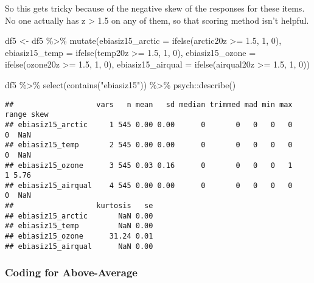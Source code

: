 \documentclass[
]{article}
\newenvironment{Shaded}{\begin{snugshade}}{\end{snugshade}}
\newcommand{\AttributeTok}[1]{\textcolor[rgb]{0.77,0.63,0.00}{#1}}
\newcommand{\DecValTok}[1]{\textcolor[rgb]{0.00,0.00,0.81}{#1}}
\newcommand{\FloatTok}[1]{\textcolor[rgb]{0.00,0.00,0.81}{#1}}
\newcommand{\FunctionTok}[1]{\textcolor[rgb]{0.00,0.00,0.00}{#1}}
\newcommand{\NormalTok}[1]{#1}
\newcommand{\OtherTok}[1]{\textcolor[rgb]{0.56,0.35,0.01}{#1}}
\newcommand{\SpecialCharTok}[1]{\textcolor[rgb]{0.00,0.00,0.00}{#1}}
\newcommand{\StringTok}[1]{\textcolor[rgb]{0.31,0.60,0.02}{#1}}
\begin{document}
So this gets tricky because of the negative skew of the responses for
these items. No one actually has z \textgreater{} 1.5 on any of them, so
that scoring method isn't helpful.

\begin{Shaded}
\begin{Highlighting}[]
\NormalTok{df5 }\OtherTok{\textless{}{-}}\NormalTok{ df5 }\SpecialCharTok{\%\textgreater{}\%}
  \FunctionTok{mutate}\NormalTok{(}\AttributeTok{ebiasiz15\_arctic =} \FunctionTok{ifelse}\NormalTok{(arctic20z }\SpecialCharTok{\textgreater{}=} \FloatTok{1.5}\NormalTok{, }\DecValTok{1}\NormalTok{, }\DecValTok{0}\NormalTok{),}
         \AttributeTok{ebiasiz15\_temp =} \FunctionTok{ifelse}\NormalTok{(temp20z }\SpecialCharTok{\textgreater{}=} \FloatTok{1.5}\NormalTok{, }\DecValTok{1}\NormalTok{, }\DecValTok{0}\NormalTok{),}
         \AttributeTok{ebiasiz15\_ozone =} \FunctionTok{ifelse}\NormalTok{(ozone20z }\SpecialCharTok{\textgreater{}=} \FloatTok{1.5}\NormalTok{, }\DecValTok{1}\NormalTok{, }\DecValTok{0}\NormalTok{),}
         \AttributeTok{ebiasiz15\_airqual =} \FunctionTok{ifelse}\NormalTok{(airqual20z }\SpecialCharTok{\textgreater{}=} \FloatTok{1.5}\NormalTok{, }\DecValTok{1}\NormalTok{, }\DecValTok{0}\NormalTok{))}

\NormalTok{df5 }\SpecialCharTok{\%\textgreater{}\%} 
  \FunctionTok{select}\NormalTok{(}\FunctionTok{contains}\NormalTok{(}\StringTok{"ebiasiz15"}\NormalTok{)) }\SpecialCharTok{\%\textgreater{}\%} 
\NormalTok{  psych}\SpecialCharTok{::}\FunctionTok{describe}\NormalTok{()}
\end{Highlighting}
\end{Shaded}

\begin{verbatim}
##                   vars   n mean   sd median trimmed mad min max range skew
## ebiasiz15_arctic     1 545 0.00 0.00      0       0   0   0   0     0  NaN
## ebiasiz15_temp       2 545 0.00 0.00      0       0   0   0   0     0  NaN
## ebiasiz15_ozone      3 545 0.03 0.16      0       0   0   0   1     1 5.76
## ebiasiz15_airqual    4 545 0.00 0.00      0       0   0   0   0     0  NaN
##                   kurtosis   se
## ebiasiz15_arctic       NaN 0.00
## ebiasiz15_temp         NaN 0.00
## ebiasiz15_ozone      31.24 0.01
## ebiasiz15_airqual      NaN 0.00
\end{verbatim}

\hypertarget{coding-for-above-average}{%
\subsubsection{Coding for
Above-Average}\label{coding-for-above-average}}
\end{document}
